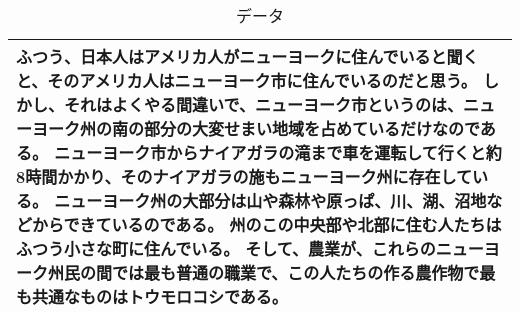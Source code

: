 \begin{table*}[t]
  \begin{center}
    \leavevmode
    \caption{データ}
    \label{tab:mensetsu}
\small
\begin{tabular}[h]{|p{13.5cm}|}\hline
 ふつう、日本人はアメリカ人がニューヨークに住んでいると聞くと、そのアメリカ人はニューヨーク市に住んでいるのだと思う。
しかし、それはよくやる間違いで、ニューヨーク市というのは、ニューヨーク州の南の部分の大変せまい地域を占めているだけなのである。
ニューヨーク市からナイアガラの滝まで車を運転して行くと約8時間かかり、そのナイアガラの施もニューヨーク州に存在している。
ニューヨーク州の大部分は山や森林や原っぱ、川、湖、沼地などからできているのである。
州のこの中央部や北部に住む人たちはふつう小さな町に住んでいる。
そして、農業が、これらのニューヨーク州民の間では最も普通の職業で、この人たちの作る農作物で最も共通なものはトウモロコシである。\\\hline
\end{tabular}
  \end{center}
\end{table*}

